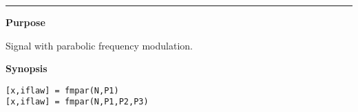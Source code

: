 


\hspace*{-1.6cm}{\Large \bf fmpar}

\vspace*{-.4cm}
\hspace*{-1.6cm}\rule[0in]{16.5cm}{.02cm}
\vspace*{.2cm}



{\bf \large {}\selectfont Purpose}\\
\hspace*{1.5cm}
\begin{minipage}[t]{13.5cm}
Signal with parabolic frequency modulation.
\end{minipage}
\vspace*{.5cm}


{\bf \large {}\selectfont Synopsis}\\
\hspace*{1.5cm}
\begin{minipage}[t]{13.5cm}
\begin{verbatim}
[x,iflaw] = fmpar(N,P1)
[x,iflaw] = fmpar(N,P1,P2,P3)
\end{verbatim}
\end{minipage}
\vspace*{.5cm}


